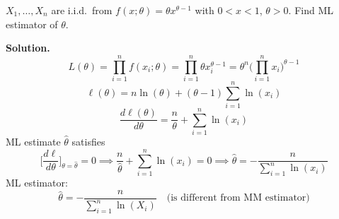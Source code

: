\begin{Example}{}{}
    $ X_1,\ldots,X_n $ are i.i.d.\ from $ f(x;\theta)=\theta x^{\theta-1} $
    with $ 0<x<1 $, $ \theta>0 $.
    Find ML estimator of $ \theta $.

    \textbf{Solution.}
    \[ L(\theta)=\prod_{i=1}^n f(x_i;\theta)=
        \prod_{i=1}^n \theta x_i^{\theta-1}=\theta^n\biggl(\prod_{i=1}^n x_i \biggr)^{\!\theta-1} \]
    \[ \ell(\theta)=n\ln(\theta)+(\theta-1)\sum_{i=1}^{n} \ln(x_i) \]
    \[ \frac{d\ell(\theta)}{d\theta}=\frac{n}{\theta} +\sum_{i=1}^{n} \ln(x_i)  \]
    ML estimate $ \hat{\theta} $ satisfies
    \[ \biggl[\frac{d\ell}{d\theta}\biggr]_{\theta=\hat{\theta}}=0\implies
        \frac{n}{\hat{\theta}} +\sum_{i=1}^{n} \ln(x_i)=0
        \implies \hat{\theta}=-\frac{n}{\sum_{i=1}^{n} \ln(x_i)}  \]
    ML estimator:
    \[ \hat{\theta}=-\frac{n}{\sum_{i=1}^{n} \ln(X_i)}\quad\text{(is different from MM estimator)} \]
\end{Example}
